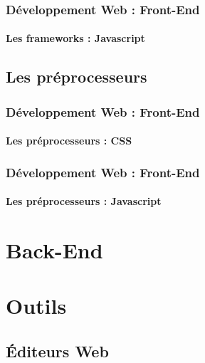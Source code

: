 \documentclass[xcolor=table]{beamer}
\begin{document}
\begin{frame}
\frametitle{Développement Web : Front-End}
\framesubtitle{Les frameworks : Javascript}

\end{frame}

\subsection{Les préprocesseurs}

\begin{frame}
\frametitle{Développement Web : Front-End}
\framesubtitle{Les préprocesseurs : CSS}

\end{frame}

\begin{frame}
\frametitle{Développement Web : Front-End}
\framesubtitle{Les préprocesseurs : Javascript}

\end{frame}

\section{Back-End}

\section{Outils}

\subsection{Éditeurs Web}
\end{document}
